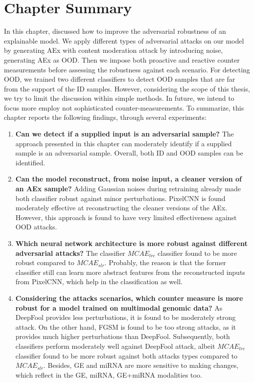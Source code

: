 \section{Chapter Summary} \label{chapter_6:conclusion}
In this chapter, discussed how to improve the adversarial robustness of an explainable model. We apply different types of adversarial attacks on our model by generating AEx with content moderation attack by introducing noise, generating AEx as OOD. Then we impose both proactive and reactive counter measurements before assessing the robustness against each scenario. 
For detecting OOD, we trained two different classifiers to detect OOD samples that are far from the support of the ID samples. However, considering the scope of this thesis, we try to limit the discussion within simple methods. In future, we intend to focus more employ not sophisticated counter-measurements. To summarize, this chapter reports the following findings, through several experiments:

\begin{enumerate}[noitemsep]
    \item \textbf{Can we detect if a supplied input is an adversarial sample?} The approach presented in this chapter can moderately identify if a supplied sample is an adversarial sample. Overall, both ID and OOD samples can be identified. 
    
    \item \textbf{Can the model reconstruct, from noise input, a cleaner version of an AEx sample?} Adding Gaussian noises during retraining already made both classifier robust against minor perturbations.  PixelCNN is found moderately effective at reconstructing the cleaner versions of the AEx. However, this approach is found to have very limited effectiveness against OOD attacks. 
    
    \item \textbf{Which neural network architecture is more robust against different adversarial attacks?} The classifier $MCAE_{lrc}$ classifier found to be more robust compared to $MCAE_{slr}$. Probably, the reason is that the former classifier still can learn more abstract features from the reconstructed inputs from PixelCNN, which help in the classification as well.  
    
    \item \textbf{Considering the attacks scenarios, which counter measure is more robust for a model trained on multimodal genomic data?} As DeepFool provides less perturbations, it is found to be moderately strong attack. On the other hand, FGSM is found to be too strong attacks, as it provides much higher perturbations than DeepFool. Subsequently, both classifiers perform moderately well against DeepFool attack, albeit $MCAE_{lrc}$ classifier found to be more robust against both attacks types compared to $MCAE_{slr}$. Besides, GE and miRNA are more sensitive to making changes, which reflect in the GE, miRNA, GE+miRNA modalities too. 
\end{enumerate}

